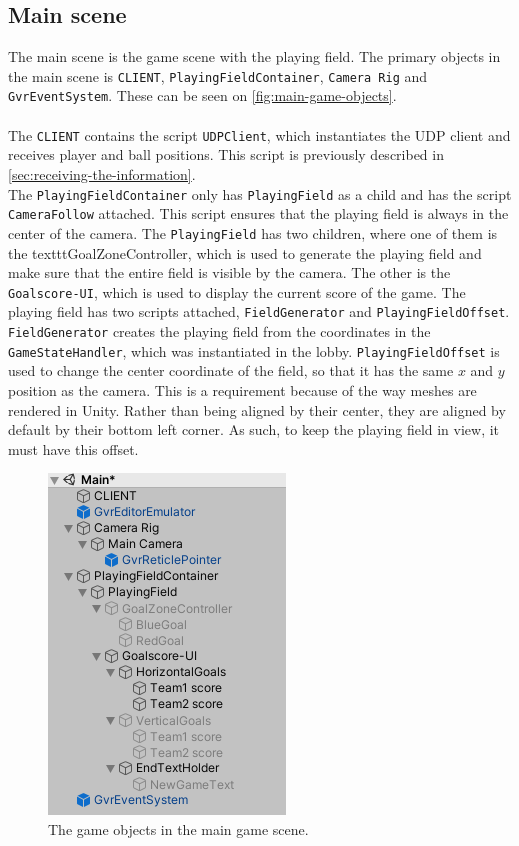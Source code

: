\subsection{Main scene}
The main scene is the game scene with the playing field.
The primary objects in the main scene is \texttt{CLIENT}, \texttt{PlayingFieldContainer}, \texttt{Camera Rig} and \texttt{GvrEventSystem}.
These can be seen on \autoref{fig:main-game-objects}.
\\\\
The \texttt{CLIENT} contains the script \texttt{UDPClient}, which instantiates the UDP client and receives player and ball positions.
This script is previously described in \autoref{sec:receiving-the-information}.
\\
The \texttt{PlayingFieldContainer} only has \texttt{PlayingField} as a child and has the script \texttt{CameraFollow} attached.
This script ensures that the playing field is always in the center of the camera.
The \texttt{PlayingField} has two children, where one of them is the texttt{GoalZoneController}, which is used to generate the playing field and make sure that the entire field is visible by the camera.
The other is the \texttt{Goalscore-UI}, which is used to display the current score of the game.
The playing field has two scripts attached, \texttt{FieldGenerator} and \texttt{PlayingFieldOffset}.
\texttt{FieldGenerator} creates the playing field from the coordinates in the \texttt{GameStateHandler}, which was instantiated in the lobby.
\texttt{PlayingFieldOffset} is used to change the center coordinate of the field, so that it has the same $x$ and $y$ position as the camera.
This is a requirement because of the way meshes are rendered in Unity.
Rather than being aligned by their center, they are aligned by default by their bottom left corner.
As such, to keep the playing field in view, it must have this offset.

\begin{figure}[H]
    \centering
    \includegraphics[width=0.4\linewidth]{figures/unity-main-gameobjects.PNG}
    \caption{The game objects in the main game scene.}
    \label{fig:main-game-objects}
\end{figure}
